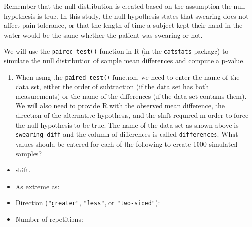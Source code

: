 \documentclass[
]{report}
\providecommand{\tightlist}{%
  \setlength{\itemsep}{0pt}\setlength{\parskip}{0pt}}
\begin{document}
Remember that the null distribution is created based on the assumption the null hypothesis is true. In this study, the null hypothesis states that swearing does not affect pain tolerance, or that the length of time a subject kept their hand in the water would be the same whether the patient was swearing or not.

We will use the \texttt{paired\_test()} function in R (in the \texttt{catstats} package) to simulate the null distribution of sample mean differences and compute a p-value.

\begin{enumerate}
\def\labelenumi{\arabic{enumi}.}
\setcounter{enumi}{10}
\tightlist
\item
  When using the \texttt{paired\_test()} function, we need to enter the name of the data set, either the order of subtraction (if the data set has both measurements) or the name of the differences (if the data set contains them). We will also need to provide R with the observed mean difference, the direction of the alternative hypothesis, and the shift required in order to force the null hypothesis to be true. The name of the data set as shown above is \texttt{swearing\_diff} and the column of differences is called \texttt{differences}. What values should be entered for each of the following to create 1000 simulated samples?
\end{enumerate}

\vspace{1mm}

\begin{itemize}
\tightlist
\item
  shift:
\end{itemize}

\vspace{.2in}

\begin{itemize}
\tightlist
\item
  As extreme as:
\end{itemize}

\vspace{.2in}

\begin{itemize}
\tightlist
\item
  Direction (\texttt{"greater"}, \texttt{"less"}, or \texttt{"two-sided"}):
\end{itemize}

\vspace{.2in}

\begin{itemize}
\tightlist
\item
  Number of repetitions:
\end{itemize}
\end{document}
